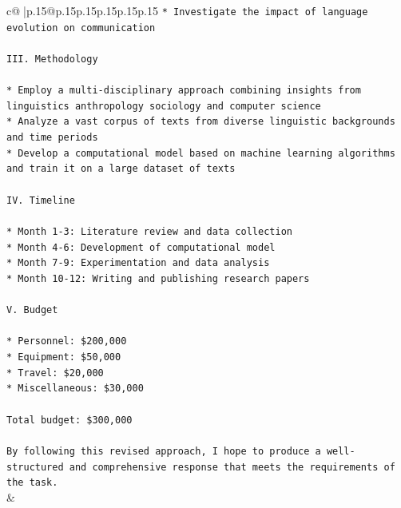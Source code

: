 \documentclass{article}
\begin{document}
{\begin{supertabular}{c@{$\;$}|p{.15\linewidth}@{}p{.15\linewidth}p{.15\linewidth}p{.15\linewidth}p{.15\linewidth}p{.15\linewidth}}
{{{\texttt{* Investigate the impact of language evolution on communication} \\
\\ 
\texttt{III. Methodology} \\
\\ 
\texttt{* Employ a multi{-}disciplinary approach combining insights from linguistics anthropology sociology and computer science} \\
\texttt{* Analyze a vast corpus of texts from diverse linguistic backgrounds and time periods} \\
\texttt{* Develop a computational model based on machine learning algorithms and train it on a large dataset of texts} \\
\\ 
\texttt{IV. Timeline} \\
\\ 
\texttt{* Month 1{-}3: Literature review and data collection} \\
\texttt{* Month 4{-}6: Development of computational model} \\
\texttt{* Month 7{-}9: Experimentation and data analysis} \\
\texttt{* Month 10{-}12: Writing and publishing research papers} \\
\\ 
\texttt{V. Budget} \\
\\ 
\texttt{* Personnel: \$200,000} \\
\texttt{* Equipment: \$50,000} \\
\texttt{* Travel: \$20,000} \\
\texttt{* Miscellaneous: \$30,000} \\
\\ 
\texttt{Total budget: \$300,000} \\
\\ 
\texttt{By following this revised approach, I hope to produce a well{-}structured and comprehensive response that meets the requirements of the task.} \\
            }
        }
    }
    & \\ \\

\end{supertabular}
}
\end{document}
